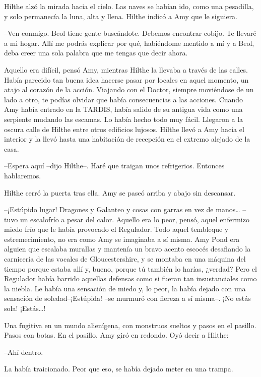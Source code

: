{Hilthe alzó la mirada hacia el cielo. Las naves se habían ido, como una
	pesadilla, y solo permanecía la luna, alta y llena. Hilthe indicó a Amy
que le siguiera.}

{--Ven conmigo. Beol tiene gente buscándote. Debemos encontrar cobijo.
	Te llevaré a mi hogar. Allí me podrás explicar por qué, habiéndome
	mentido a mí y a Beol, deba creer una sola palabra que me tengas que
decir ahora.}

{Aquello era difícil, pensó Amy, mientras Hilthe la llevaba a través de
	las calles. Había parecido tan buena idea hacerse pasar por locales en
	aquel momento, un atajo al corazón de la acción. Viajando con el Doctor,
	siempre moviéndose de un lado a otro, te podías olvidar que había
	consecuencias a las acciones. Cuando Amy había entrado en la TARDIS,
	había salido de su antigua vida como una serpiente mudando las escamas.
	Lo había hecho todo muy fácil. Llegaron a la oscura calle de Hilthe
	entre otros edificios lujosos. Hilthe llevó a Amy hacia el interior y la
	llevó hasta una habitación de recepción en el extremo alejado de la
casa.}

{--Espera aquí --dijo Hilthe--. Haré que traigan unos refrigerios.
Entonces hablaremos.}

{Hilthe cerró la puerta tras ella. Amy se paseó arriba y abajo sin
descansar.}

{--¡Estúpido lugar! Dragones y Galanteo y cosas con garras en vez de
	manos\ldots{} --tuvo un escalofrío a pesar del calor. Aquello era lo
	peor, pensó, aquel enfermizo miedo frío que le había provocado el
	Regulador. Todo aquel tembleque y estremecimiento, no era como Amy se
	imaginaba a sí misma. Amy Pond era alguien que escalaba murallas y
	mantenía un bravo acento escocés desafiando la carnicería de las vocales
	de Gloucestershire, y se montaba en una máquina del tiempo porque estaba
	allí y, bueno, porque tú también lo harías, ¿verdad? Pero el Regulador
	había barrido aquellas defensas como si fueran tan insustanciales como
	la niebla. Le había una sensación de miedo y, lo peor, la había dejado
	con una sensación de soledad--¡Estúpida! --se murmuró con fiereza a sí
	misma--. ¡No estás sola! ¡Estás\ldots{}!}

{Una fugitiva en un mundo alienígena, con monstruos sueltos y pasos en
	el pasillo. Pasos con botas. En el pasillo. Amy giró en redondo. Oyó
decir a Hilthe:}

{--Ahí dentro.}

{La había traicionado. Peor que eso, se había dejado meter en una
trampa.}

